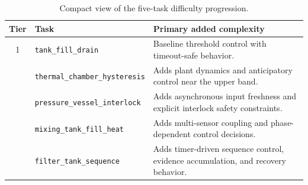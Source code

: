 \documentclass[a4paper,fleqn]{cas-dc}
\DeclareRobustCommand{\tool}[1]{\texttt{\nolinkurl{#1}}}
\begin{document}
\begin{table}[t]
\caption{Compact view of the five-task difficulty progression.}
\label{tab:task-ladder}
\small
\begingroup
\renewcommand{\arraystretch}{1.0}
\begin{tabular*}{\tblwidth}{@{}cP{0.31\textwidth}P{0.56\textwidth}@{}}
\toprule
Tier & Task & Primary added complexity \\
 & \tool{tank_fill_drain} & Baseline threshold control with timeout-safe behavior. \\
 & \tool{thermal_chamber_hysteresis} & Adds plant dynamics and anticipatory control near the upper band. \\
 & \tool{pressure_vessel_interlock} & Adds asynchronous input freshness and explicit interlock safety constraints. \\
 & \tool{mixing_tank_fill_heat} & Adds multi-sensor coupling and phase-dependent control decisions. \\
 & \tool{filter_tank_sequence} & Adds timer-driven sequence control, evidence accumulation, and recovery behavior. \\
\bottomrule
\end{tabular*}
\endgroup
\end{table}
\end{document}
